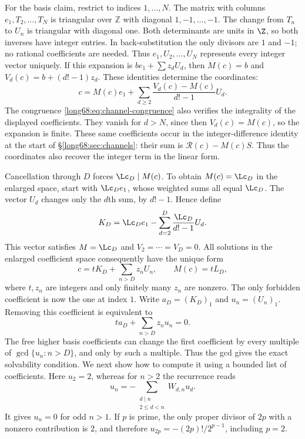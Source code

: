 For the basis claim, restrict to indices $1,\ldots,N$. The matrix with
columns $e_1,T_2,\ldots,T_N$ is triangular over $\mathbb Z$ with
diagonal $1,-1,\ldots,-1$. The change from $T_n$ to $U_n$ is
triangular with diagonal one. Both determinants are units in $\Z$,
so both inverses have integer entries. In back-substitution the only
divisors are $1$ and $-1$; no rational coefficients are needed.
Thus $e_1,U_2,\ldots,U_N$ represents every integer vector uniquely.
If this expansion is $b e_1+\sum z_dU_d$, then $M(c)=b$ and
$V_d(c)=b+(d!-1)z_d$. These identities determine the coordinates:
\[
 c=M(c)e_1+\sum_{d\ge2}\frac{V_d(c)-M(c)}{d!-1}U_d.
\]
The congruence \eqref{long68:eq:channel-congruence} also verifies the
integrality of the displayed coefficients. They vanish for $d>N$,
since then $V_d(c)=M(c)$, so the expansion is finite. These same
coefficients occur in the integer-difference identity at the start of
\S\ref{long68:sec:channels}: their sum is $\mathcal R(c)-M(c)S$.
Thus the coordinates also recover the integer term in the linear form.

Cancellation through $D$ forces $\Lc_D\mid M(c)$. To obtain
$M(c)=\Lc_D$ in the enlarged space, start with $\Lc_De_1$, whose weighted
sums all equal $\Lc_D$. The vector $U_d$ changes only the $d$th sum,
by $d!-1$. Hence define
\[
 K_D=\Lc_De_1-\sum_{d=2}^D\frac{\Lc_D}{d!-1}U_d.
\]
This vector satisfies $M=\Lc_D$ and $V_2=\cdots=V_D=0$.
All solutions in the enlarged coefficient space consequently have the
unique form
\begin{equation}\label{long68:eq:low-channel-basis}
 c=tK_D+\sum_{n>D}z_nU_n,\qquad M(c)=tL_D,
\end{equation}
where $t,z_n$ are integers and only finitely many $z_n$ are nonzero.
The only forbidden coefficient is now the one at index $1$.
Write $a_D=(K_D)_1$ and $u_n=(U_n)_1$. Removing this coefficient
is equivalent to
\begin{equation}\label{long68:eq:low-channel-support}
 ta_D+\sum_{n>D}z_nu_n=0.
\end{equation}
The free higher basis coefficients can change the first coefficient by every
multiple of $\gcd\{u_n:n>D\}$, and only by such a multiple. Thus the
gcd gives the exact solvability condition. We next show how to compute
it using a bounded list of coefficients.
Here $u_2=2$, whereas for $n>2$ the recurrence reads
\[
 u_n=-\sum_{\substack{d\mid n\\2\le d<n}}W_{d,n}u_d.
\]
It gives $u_n=0$ for odd $n>1$. If $p$ is prime, the only proper divisor
of $2p$ with a nonzero contribution is $2$, and therefore
$u_{2p}=-(2p)!/2^{p-1}$, including $p=2$.

